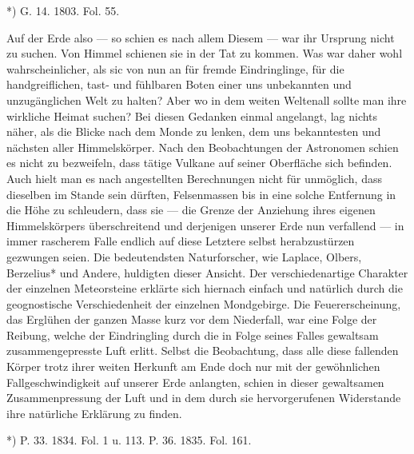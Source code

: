 \documentclass[a4paper, 11pt, oneside, polutonikogreek, german]{article}
\begin{document}
*) G. 14. 1803. Fol. 55.

Auf der Erde also — so schien es nach allem Diesem — war ihr Ursprung nicht zu suchen. Von Himmel schienen sie in der Tat zu kommen. Was war daher wohl wahrscheinlicher, als sic von nun an für fremde Eindringlinge, für die handgreiflichen, tast- und fühlbaren Boten einer uns unbekannten und unzugänglichen Welt zu halten? Aber wo in dem weiten Weltenall sollte man ihre wirkliche Heimat suchen? Bei diesen Gedanken einmal angelangt, lag nichts näher, als die Blicke nach dem Monde zu lenken, dem uns bekanntesten und nächsten aller Himmelskörper. Nach den Beobachtungen der Astronomen schien es nicht zu bezweifeln, dass tätige Vulkane auf seiner Oberfläche sich befinden. Auch hielt man es nach angestellten Berechnungen nicht für unmöglich, dass dieselben im Stande sein dürften, Felsenmassen bis in eine solche Entfernung in die Höhe zu schleudern, dass sie — die Grenze der Anziehung ihres eigenen Himmelskörpers überschreitend und derjenigen unserer Erde nun verfallend — in immer rascherem Falle endlich auf diese Letztere selbst herabzustürzen gezwungen seien. Die bedeutendsten Naturforscher, wie Laplace, Olbers, Berzelius* und Andere, huldigten dieser Ansicht. Der verschiedenartige Charakter der einzelnen Meteorsteine erklärte sich hiernach einfach und natürlich durch die geognostische Verschiedenheit der einzelnen Mondgebirge. Die Feuererscheinung, das Erglühen der ganzen Masse kurz vor dem Niederfall, war eine Folge der Reibung, welche der Eindringling durch die in Folge seines Falles gewaltsam zusammengepresste Luft erlitt. Selbst die Beobachtung, dass alle diese fallenden Körper trotz ihrer weiten Herkunft am Ende doch nur mit der gewöhnlichen Fallgeschwindigkeit auf unserer Erde anlangten, schien in dieser gewaltsamen Zusammenpressung der Luft und in dem durch sie hervorgerufenen Widerstande ihre natürliche Erklärung zu finden.

*) P. 33. 1834. Fol. 1 u. 113. P. 36. 1835. Fol. 161.
\end{document}
